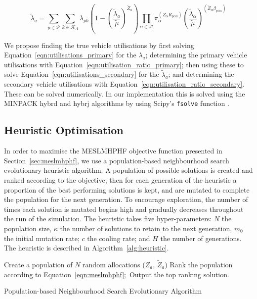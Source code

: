 \documentclass[preprint,12pt]{elsarticle}
\begin{document}
\begin{equation}\label{eqn:utilisations_secondary}
\tilde{\lambda}_a = \sum_{p \in \mathcal{P}}
\sum_{k \in \mathcal{K}_A} \lambda_{pk}
\left( 1 - \left(\frac{\tilde{\lambda}_a}{\tilde{\mu}}\right)^{\tilde{Z}_a} \right)
\prod_{\alpha \in \mathcal{A}} \pi_{\alpha}^{\left(Z_{\alpha} R_{p \alpha a}\right)}
\left(\frac{\tilde{\lambda}_{\alpha}}{\tilde{\mu}}\right)^{
\left(\tilde{Z}_{\alpha} \beta_{p \alpha a}\right)}
\end{equation}

We propose finding the true vehicle utilisations by first solving
Equation~\ref{eqn:utilisations_primary} for the $\lambda_a$; determining the
primary vehicle utilisations with Equation~\ref{eqn:utilisation_ratio_primary};
then using these to solve Equation~\ref{eqn:utilisations_secondary} for the
$\tilde{\lambda}_a$; and determining the secondary vehicle utilisations with
Equation~\ref{eqn:utilisation_ratio_secondary}. These can be solved
numerically. In our implementation this is solved using the MINPACK hybrd and
hybrj algorithms by using Scipy's \texttt{fsolve} function
\cite{2020SciPy-NMeth}.




\subsection{Heuristic Optimisation}\label{sec:heuristic}
In order to maximise the MESLMHPHF objective function presented in
Section~\ref{sec:meslmhphf}, we use a population-based neighbourhood search
evolutionary heuristic algorithm. A population of possible solutions is
created and ranked according to the objective, then for each generation of the
heuristic a proportion of the best performing solutions is kept, and are
mutated to complete the population for the next generation. To encourage
exploration, the number of times each solution is mutated begins high and
gradually decreases throughout the run of the simulation.
The heuristic takes five hyper-parameters: $N$ the population size, $\kappa$
the number of solutions to retain to the next generation, $m_0$ the initial
mutation rate; $c$ the cooling rate; and $H$ the number of generations. The
heuristic is described in Algorithm~\ref{alg:heuristic}.

\begin{algorithm}
\SetAlgoLined
Create a population of $N$ random allocations ($Z_a$, $\tilde{Z}_a$)\;
Rank the population according to Equation~\ref{eqn:meslmhphf};\
Output the top ranking solution.
\caption{Population-based Neighbourhood Search Evolutionary Algorithm}
\label{alg:heuristic}
\end{algorithm}
\end{document}
